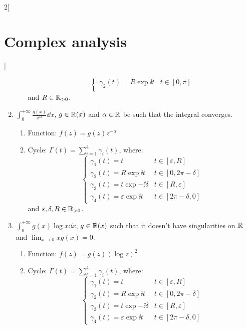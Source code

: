 \documentclass[../../../main.tex]{subfiles}
\begin{document}
\begin{multicols}{2}[\section{Complex analysis}]
\begin{method}
\begin{enumerate}
\begin{enumerate}
$$\begin{cases}
                        \gamma_2(t)=R\exp{\ii t} & t\in[0,\pi] \\
                      \end{cases}
                    $$
                    and $R\in\mathbb{R}_{>0}$.
            \end{enumerate}
      \item $\displaystyle\int_0^{+\infty} \frac{g(x)}{x^\alpha}\dd{x}$, $g\in\mathbb{R}(x)$ and $\alpha\in\mathbb{R}$ be such that the integral converges.
            \begin{enumerate}
              \item Function: $f(z)=g(z)z^{-\alpha}$
              \item Cycle: $\Gamma(t)=\sum_{i=1}^4\gamma_i(t)$, where:
                    $$
                      \begin{cases}
                        \gamma_1(t)=t                      & t\in[\varepsilon,R] \\
                        \gamma_2(t)=R\exp{\ii t}           & t\in[0,2\pi-\delta] \\
                        \gamma_3(t)=t\exp{-\ii \delta}     & t\in[R,\varepsilon] \\
                        \gamma_4(t)=\varepsilon\exp{\ii t} & t\in[2\pi-\delta,0]
                      \end{cases}
                    $$
                    and $\varepsilon,\delta,R\in\mathbb{R}_{>0}$.
            \end{enumerate}
      \item $\displaystyle\int_0^{+\infty} g(x)\log{x}\dd{x}$, $g\in\mathbb{R}(x)$ such that it doesn't have singularities on $\mathbb{R}$ and $\displaystyle\lim_{x\to 0}xg(x)=0$.
            \begin{enumerate}
              \item Function: $f(z)=g(z){(\log{z})}^2$
              \item Cycle: $\Gamma(t)=\sum_{i=1}^4\gamma_i(t)$, where:
                    $$
                      \begin{cases}
                        \gamma_1(t)=t                      & t\in[\varepsilon,R] \\
                        \gamma_2(t)=R\exp{\ii t}           & t\in[0,2\pi-\delta] \\
                        \gamma_3(t)=t\exp{-\ii \delta}     & t\in[R,\varepsilon] \\
                        \gamma_4(t)=\varepsilon\exp{\ii t} & t\in[2\pi-\delta,0]
                      \end{cases}
$$
\end{enumerate}
\end{enumerate}
\end{method}
\end{multicols}
\end{document}
